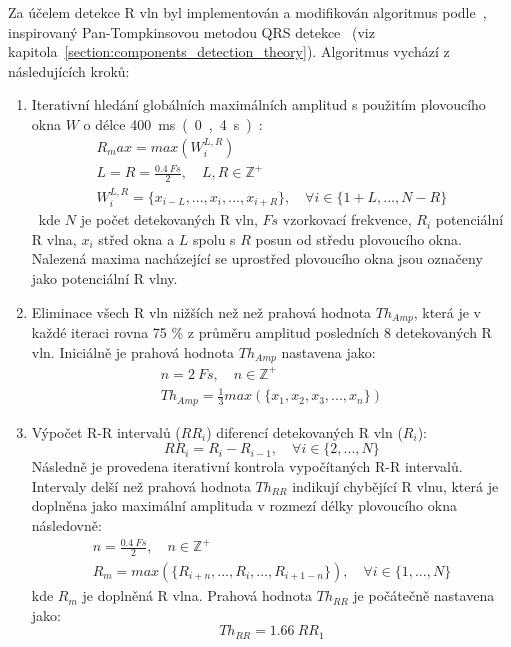 Za účelem detekce R vln byl implementován a modifikován algoritmus
podle~\cite{Nabian2018}, inspirovaný Pan-Tompkinsovou metodou QRS
detekce~\cite{Pan1985} (viz kapitola~\ref{section:components_detection_theory}).
Algoritmus vychází z následujících kroků:
\begin{enumerate}
    \item Iterativní hledání globálních maximálních amplitud s použitím
          plovoucího okna $W$ o délce 400~\si\ms~(0,4~\si\s):
          \begin{gather}
              R_max = max(W_i^{L,R}) \nonumber \\
              L = R = \frac{0.4~Fs}{2}, \quad L,R \in \mathbb{Z^+} \nonumber \\
              W_i^{L,R} = \{x_{i-L},...,x_i,...,x_{i+R}\}, \quad \forall i \in \{1+L,...,N-R\}
          \end{gather}
          kde $N$ je počet detekovaných R vln, $Fs$ vzorkovací frekvence, $R_i$
          potenciální R vlna, $x_i$ střed okna a $L$ spolu s $R$ posun od středu
          plovoucího okna. Nalezená maxima nacházející se uprostřed plovoucího
          okna jsou označeny jako potenciální R vlny.
    \item Eliminace všech R vln nižších než než prahová hodnota $Th_{Amp}$, která je v
          každé iteraci rovna 75 \% z průměru amplitud posledních 8 detekovaných
          R vln. Iniciálně je prahová hodnota $Th_{Amp}$ nastavena jako:
          \begin{gather}
              n = 2~Fs, \quad n \in \mathbb{Z^+} \nonumber \\
              Th_{Amp} = \frac{1}{3} max(\{x_1,x_2,x_3,...,x_n\})
          \end{gather}
    \item Výpočet R-R intervalů ($RR_i$) diferencí detekovaných R vln ($R_i$):
          \begin{equation}
              RR_i = R_{i} - R_{i-1}, \quad \forall i \in \{2,...,N\}
          \end{equation}
          Následně je provedena iterativní kontrola vypočítaných R-R intervalů.
          Intervaly delší než prahová hodnota $Th_{RR}$ indikují chybějící R
          vlnu, která je doplněna jako maximální amplituda v rozmezí délky
          plovoucího okna následovně:
          \begin{gather}
              n = \frac{0.4~Fs}{2}, \quad n \in \mathbb{Z^+} \nonumber \\
              R_m = max(\{R_{i+n},...,R_i,...,R_{i+1-n}\}), \quad \forall i \in \{1,...,N\}
          \end{gather}
          kde $R_m$ je doplněná R vlna. Prahová hodnota $Th_{RR}$ je počátečně
          nastavena jako:
          \begin{equation}
              Th_{RR} = 1.66~RR_1
          \end{equation}
\end{enumerate}

